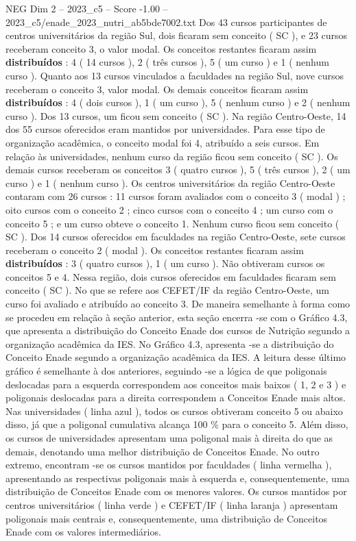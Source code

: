\begin{textsample}{NEG Dim 2 – 2023\_c5 – Score -1.00 – 2023\_c5/enade\_2023\_nutri\_ab5bde7002.txt}
Dos 43 cursos participantes de centros universitários da região Sul, dois ficaram sem conceito ( SC ), e 23 cursos receberam conceito 3, o valor modal.
Os conceitos restantes ficaram assim \textbf{distribuídos} : 4 ( 14 cursos ), 2 ( três cursos ), 5 ( um curso ) e 1 ( nenhum curso ).
Quanto aos 13 cursos vinculados a faculdades na região Sul, nove cursos receberam o conceito 3, valor modal.
Os demais conceitos ficaram assim \textbf{distribuídos} : 4 ( dois cursos ), 1 ( um curso ), 5 ( nenhum curso ) e 2 ( nenhum curso ).
Dos 13 cursos, um ficou sem conceito ( SC ).
Na região Centro-Oeste, 14 dos 55 cursos oferecidos eram mantidos por universidades.
Para esse tipo de organização acadêmica, o conceito modal foi 4, atribuído a seis cursos.
Em relação às universidades, nenhum curso da região ficou sem conceito ( SC ).
Os demais cursos receberam os conceitos 3 ( quatro cursos ), 5 ( três cursos ), 2 ( um curso ) e 1 ( nenhum curso ).
Os centros universitários da região Centro-Oeste contaram com 26 cursos : 11 cursos foram avaliados com o conceito 3 ( modal ) ; oito cursos com o conceito 2 ; cinco cursos com o conceito 4 ; um curso com o conceito 5 ; e um curso obteve o conceito 1.
Nenhum curso ficou sem conceito ( SC ).
Dos 14 cursos oferecidos em faculdades na região Centro-Oeste, sete cursos receberam o conceito 2 ( modal ).
Os conceitos restantes ficaram assim \textbf{distribuídos} : 3 ( quatro cursos ), 1 ( um curso ).
Não obtiveram cursos os conceitos 5 e 4.
Nessa região, dois cursos oferecidos em faculdades ficaram sem conceito ( SC ).
No que se refere aos CEFET/IF da região Centro-Oeste, um curso foi avaliado e atribuído ao conceito 3.
De maneira semelhante à forma como se procedeu em relação à seção anterior, esta seção encerra -se com o Gráfico 4.3, que apresenta a distribuição do Conceito Enade dos cursos de Nutrição segundo a organização acadêmica da IES.
No Gráfico 4.3, apresenta -se a distribuição do Conceito Enade segundo a organização acadêmica da IES.
A leitura desse último gráfico é semelhante à dos anteriores, seguindo -se a lógica de que poligonais deslocadas para a esquerda correspondem aos conceitos mais baixos ( 1, 2 e 3 ) e poligonais deslocadas para a direita correspondem a Conceitos Enade mais altos.
Nas universidades ( linha azul ), todos os cursos obtiveram conceito 5 ou abaixo disso, já que a poligonal cumulativa alcança 100 \% para o conceito 5.
Além disso, os cursos de universidades apresentam uma poligonal mais à direita do que as demais, denotando uma melhor distribuição de Conceitos Enade.
No outro extremo, encontram -se os cursos mantidos por faculdades ( linha vermelha ), apresentando as respectivas poligonais mais à esquerda e, consequentemente, uma distribuição de Conceitos Enade com os menores valores.
Os cursos mantidos por centros universitários ( linha verde ) e CEFET/IF ( linha laranja ) apresentam poligonais mais centrais e, consequentemente, uma distribuição de Conceitos Enade com os valores intermediários.

\end{textsample}
